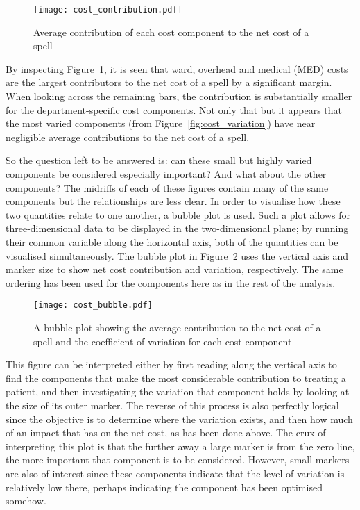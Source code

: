 \begin{figure}[h]
    \centering
    \texttt{[image: cost\_contribution.pdf]}
    \caption{%
        Average contribution of each cost component to the net cost of a spell
    }\label{fig:cost_contribution}
\end{figure}

By inspecting Figure~\ref{fig:cost_contribution}, it is seen that ward, overhead
and medical (MED) costs are the largest contributors to the net cost of a spell
by a significant margin. When looking across the remaining bars, the
contribution is substantially smaller for the department-specific cost
components. Not only that but it appears that the most varied components (from
Figure~\ref{fig:cost_variation}) have near negligible average contributions to
the net cost of a spell.

So the question left to be answered is: can these small but highly varied
components be considered especially important? And what about the other
components? The midriffs of each of these figures contain many of the same
components but the relationships are less clear. In order to visualise how these
two quantities relate to one another, a bubble plot is used. Such a plot allows
for three-dimensional data to be displayed in the two-dimensional plane; by
running their common variable along the horizontal axis, both of the quantities
can be visualised simultaneously. The bubble plot in
Figure~\ref{fig:cost_bubble} uses the vertical axis and marker size to show net
cost contribution and variation, respectively. The same ordering has been used
for the components here as in the rest of the analysis.

\begin{figure}
    \centering
    \texttt{[image: cost\_bubble.pdf]}
    \caption{%
        A bubble plot showing the average contribution to the net cost of a
        spell and the coefficient of variation for each cost component
    }\label{fig:cost_bubble}
\end{figure}

This figure can be interpreted either by first reading along the vertical axis
to find the components that make the most considerable contribution to treating
a patient, and then investigating the variation that component holds by looking
at the size of its outer marker. The reverse of this process is also perfectly
logical since the objective is to determine where the variation exists, and then
how much of an impact that has on the net cost, as has been done above. The crux
of interpreting this plot is that the further away a large marker is from the
zero line, the more important that component is to be considered. However, small
markers are also of interest since these components indicate that the level of
variation is relatively low there, perhaps indicating the component has been
optimised somehow.

